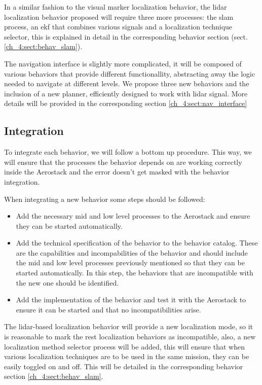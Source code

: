     In a similar fashion to the visual marker localization behavior, the lidar localization behavior proposed will require three more processes: the slam process, an ekf that combines various signals and a localization technique selector, this is explained in detail in the corresponding behavior section (sect. \ref{ch_4:sect:behav_slam}).

    The navigation interface is slightly more complicated, it will be composed of various behaviors that provide different functionallity, abstracting away the logic needed to navigate at different levels. We propose three new behaviors and the inclusion of a new planner, efficiently designed to work with lidar signal. More details will be provided in the corresponding section \ref{ch_4:sect:nav_interface}

  \subsection{Integration} \label{ch_4:subsect:integration}

    To integrate each behavior, we will follow a bottom up procedure. This way, we will ensure that the processes the behavior depends on are working correctly inside the Aerostack and the error doesn't get masked with the behavior integration.

    When integrating a new behavior some steps should be followed:
    \begin{itemize}
      \item Add the necessary mid and low level processes to the Aerostack and ensure they can be started automatically.
      \item Add the technical specification of the behavior to the behavior catalog. These are the capabilities and incompabilities of the behavior and should include the mid and low level processes previously mentioned so that they can be started automatically. In this step, the behaviors that are incompatible with the new one should be identified.
      \item Add the implementation of the behavior and test it with the Aerostack to ensure it can be started and that no incompatibilities arise.
    \end{itemize}

    The lidar-based localization behavior will provide a new localization mode, so it is reasonable to mark the rest localization behaviors as incompatible, also, a new localization method selector process will be added, this will ensure that when various localization techniques are to be used in the same mission, they can be easily toggled on and off. This will be detailed in the corresponding behavior section \ref{ch_4:sect:behav_slam}.

